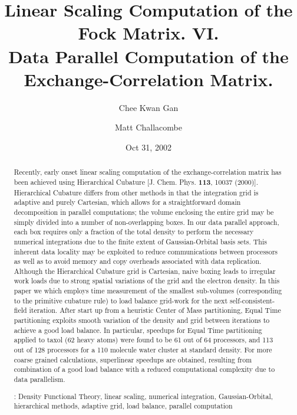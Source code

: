 \commentoutA{\documentclass[prl,aps,twocolumn,showpacs,twocolumngrid,superbib]{revtex4}}
\begin{document}
\title[Short Title]{ Linear Scaling Computation of the Fock Matrix. VI. \\ 
                     Data Parallel Computation of the Exchange-Correlation Matrix.\footnotemark[4] }

\author{Chee Kwan Gan\footnotemark[2]}
\author{Matt Challacombe\footnotemark[3]}
 


\date{Oct 31, 2002}

\begin{abstract}
Recently, early onset linear scaling computation of the
exchange-correlation matrix has been achieved using Hierarchical
Cubature [J. Chem. Phys. {\bf 113}, 10037 (2000)]. Hierarchical
Cubature differs from other methods in that the integration grid is
adaptive and purely Cartesian, which allows for a straightforward
domain decomposition in parallel computations; the volume enclosing
the entire grid may be simply divided into a number of non-overlapping
boxes. In our data parallel approach, each box requires only a fraction 
of the total density to perform the necessary numerical integrations
due to the finite extent of Gaussian-Orbital basis sets.  This inherent 
data locality may be exploited to reduce communications between processors 
as well as to avoid memory and copy overheads associated with data 
replication.  Although the Hierarchical Cubature grid is Cartesian, 
naive boxing leads to irregular work loads due to strong spatial variations 
of the grid and the electron density.  In this paper we
which employs time measurement of the smallest sub-volumes
(corresponding to the primitive cubature rule) to load balance
grid-work for the next self-consistent-field iteration.  After start
up from a heuristic Center of Mass partitioning, Equal Time
partitioning exploits smooth variation of the density and grid between
iterations to achieve a good load balance. In particular, speedups for
Equal Time partitioning applied to taxol (62 heavy atoms) were found
to be 61 out of 64 processors, and 113 out of 128 processors for a 110
molecule water cluster at standard density.  For more coarse grained
calculations, superlinear speedups are obtained, resulting from
combination of a good load balance with a reduced computational
complexity due to data parallelism.

\smallskip
{}: Density Functional Theory, linear scaling, numerical integration, Gaussian-Orbital, 
                         hierarchical methods, adaptive grid, load balance, parallel computation
\end{abstract}
\end{document}
